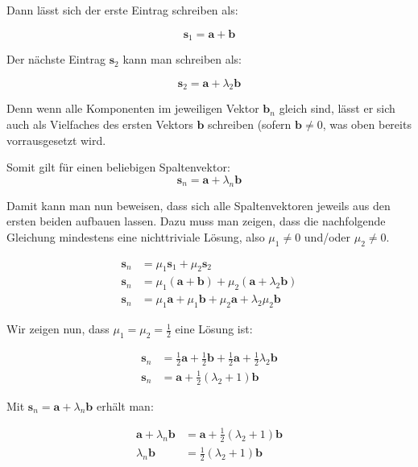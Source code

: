 \documentclass[a4paper,german,12pt,smallheadings]{scrartcl}
\begin{document}
Dann lässt sich der erste Eintrag schreiben als:

\begin{equation*}
  \mathbf{s}_1 = \mathbf{a} + \mathbf{b}
\end{equation*}

Der nächste Eintrag $\mathbf{s}_2$ kann man schreiben als:

\begin{equation*}
  \mathbf{s}_2 = \mathbf{a} + \lambda_2 \mathbf{b}
\end{equation*}

Denn wenn alle Komponenten im jeweiligen Vektor $\mathbf{b}_n$ gleich sind,
lässt er sich auch als Vielfaches des ersten Vektors $\mathbf{b}$ schreiben
(sofern $\mathbf{b} \neq 0$, was oben bereits vorrausgesetzt wird.

Somit gilt für einen beliebigen Spaltenvektor:
\begin{equation*}
  \mathbf{s}_n = \mathbf{a} + \lambda_n \mathbf{b}
\end{equation*}

Damit kann man nun beweisen, dass sich alle Spaltenvektoren jeweils aus den
ersten beiden aufbauen lassen. Dazu muss man zeigen, dass die nachfolgende
Gleichung mindestens eine nichttriviale Lösung, also $\mu_1 \neq 0$ und/oder
$\mu_2 \neq 0$.

\begin{align*}
  \mathbf{s}_n &= \mu_1 \mathbf{s}_1 + \mu_2 \mathbf{s}_2 \\
  \mathbf{s}_n &= \mu_1 (\mathbf{a} + \mathbf{b}) + \mu_2(\mathbf{a} + \lambda_2 \mathbf{b}) \\
  \mathbf{s}_n &= \mu_1 \mathbf{a} + \mu_1 \mathbf{b} + \mu_2 \mathbf{a} + \lambda_2\mu_2\mathbf{b}
\end{align*}

Wir zeigen nun, dass $\mu_1 = \mu_2 = \frac{1}{2}$ eine Lösung ist:

\begin{align*}
  \mathbf{s}_n &= \frac{1}{2} \mathbf{a} + \frac{1}{2} \mathbf{b} + \frac{1}{2} \mathbf{a} + \frac{1}{2} \lambda_2\mathbf{b} \\
  \mathbf{s}_n &= \mathbf{a} + \frac{1}{2} (\lambda_2+1)\mathbf{b}
\end{align*}

Mit $\mathbf{s}_n = \mathbf{a} + \lambda_n \mathbf{b}$ erhält man:

\begin{align*}
 \mathbf{a} + \lambda_n \mathbf{b} &= \mathbf{a} + \frac{1}{2} (\lambda_2+1)\mathbf{b} \\
 \lambda_n \mathbf{b} &= \frac{1}{2} (\lambda_2+1)\mathbf{b} \\
\end{align*}
\end{document}
